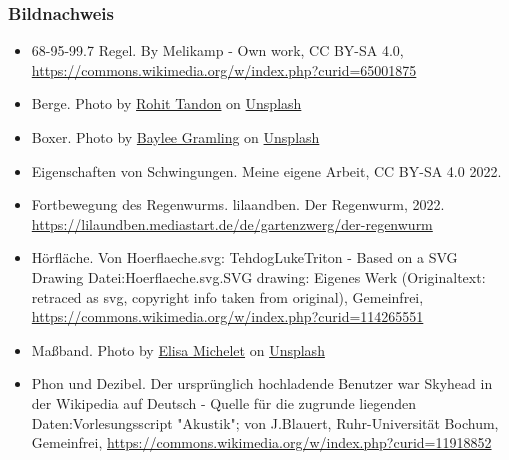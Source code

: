 \documentclass{beamer}
\begin{document}
\begin{frame}
\frametitle{Bildnachweis}
\begin{tiny}

\begin{itemize}

\item
68-95-99.7 Regel.  By Melikamp - Own work, CC BY-SA 4.0, \url{https://commons.wikimedia.org/w/index.php?curid=65001875}

\item
Berge. Photo by \href{https://unsplash.com/@sepoys?utm_source=unsplash&utm_medium=referral&utm_content=creditCopyText}{Rohit Tandon} on \href{https://unsplash.com/s/photos/mountain?utm_source=unsplash&utm_medium=referral&utm_content=creditCopyText}{Unsplash}
  

\item
Boxer. Photo by \href{https://unsplash.com/@bayleejadegramling?utm_source=unsplash&utm_medium=referral&utm_content=creditCopyText}{Baylee Gramling} on \href{https://unsplash.com/s/photos/boxer?utm_source=unsplash&utm_medium=referral&utm_content=creditCopyText}{Unsplash}
  
  \item
Eigenschaften von Schwingungen. Meine eigene Arbeit, CC BY-SA 4.0 2022.

  
\item
Fortbewegung des Regenwurms. lilaandben. Der Regenwurm, 2022. \url{https://lilaundben.mediastart.de/de/gartenzwerg/der-regenwurm}

\item
Hörfläche. Von Hoerflaeche.svg: TehdogLukeTriton - Based on a SVG Drawing Datei:Hoerflaeche.svg.SVG drawing: Eigenes Werk (Originaltext: retraced as svg, copyright info taken from original), Gemeinfrei, \url{https://commons.wikimedia.org/w/index.php?curid=114265551}

\item

Maßband. Photo by \href{https://unsplash.com/@elisamichelet?utm_source=unsplash&utm_medium=referral&utm_content=creditCopyText}{Elisa Michelet} on \href{https://unsplash.com/s/photos/measurement?utm_source=unsplash&utm_medium=referral&utm_content=creditCopyText}{Unsplash}

  \item
  Phon und Dezibel. Der ursprünglich hochladende Benutzer war Skyhead in der Wikipedia auf Deutsch - Quelle für die zugrunde liegenden Daten:Vorlesungsscript "Akustik"; von J.Blauert, Ruhr-Universität Bochum, Gemeinfrei, \url{https://commons.wikimedia.org/w/index.php?curid=11918852}
  

\end{itemize}
\end{tiny}
\end{frame}
\end{document}
